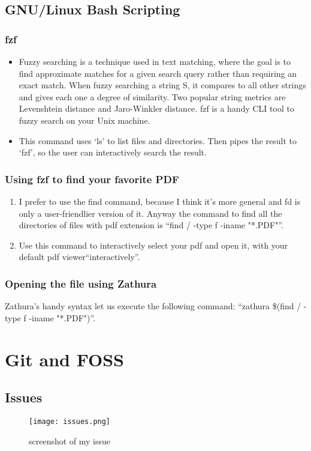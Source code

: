 \documentclass[12pt]{article}
\begin{document}
\subsection{GNU/Linux Bash Scripting}
\subsubsection{fzf}
\begin{itemize}
    \item Fuzzy searching is a technique used in text matching, where the goal is to find approximate matches for a given search query rather than requiring an exact match. When fuzzy searching a string S, it compares to all other strings and gives each one a degree of similarity. Two popular string metrics are Levenshtein distance and Jaro-Winkler distance. fzf is a handy CLI tool to fuzzy search on your Unix machine.
    \item This command uses `ls' to list files and directories. Then pipes the result to `fzf', so the user can interactively search the result.
\end{itemize}

\subsubsection{Using fzf to find your favorite PDF}
\begin{enumerate}
    \item I prefer to use the find command, because I think it's more general and fd is only a user-friendlier version of it. Anyway the command to find all the directories of files with pdf extension is ``find / -type f -iname "*.PDF"''.
    \item Use this command to interactively select your pdf and open it, with your default pdf viewer``interactively''.
\end{enumerate}

\subsubsection{Opening the file using Zathura}
Zathura's handy syntax let us execute the following command: \newline``zathura \$(find / -type f -iname "*.PDF")''.

\newpage

\section{Git and FOSS}
\subsection{Issues}
\begin{figure}
    \centering
    \texttt{[image: issues.png]}
    \caption{screenshot of my issue}
\end{figure}
\end{document}
